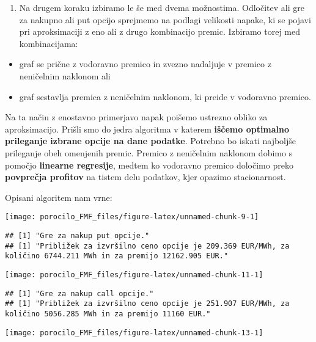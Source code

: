 \documentclass[
]{article}
\providecommand{\tightlist}{%
  \setlength{\itemsep}{0pt}\setlength{\parskip}{0pt}}
\begin{document}
\begin{enumerate}
\def\labelenumi{\arabic{enumi}.}
\setcounter{enumi}{1}
\tightlist
\item
  Na drugem koraku izbiramo le še med dvema možnostima. Odločitev ali
  gre za nakupno ali put opcijo sprejmemo na podlagi velikosti napake,
  ki se pojavi pri aproksimaciji z eno ali z drugo kombinacijo premic.
  Izbiramo torej med kombinacijama:
\end{enumerate}

\begin{itemize}
\tightlist
\item
  graf se prične z vodoravno premico in zvezno nadaljuje v premico z
  neničelnim naklonom ali
\item
  graf sestavlja premica z neničelnim naklonom, ki preide v vodoravno
  premico.
\end{itemize}

Na ta način z enostavno primerjavo napak poišemo ustrezno obliko za
aproksimacijo. Prišli smo do jedra algoritma v katerem \textbf{iščemo
optimalno prileganje izbrane opcije na dane podatke}. Potrebno bo iskati
najboljše prileganje obeh omenjenih premic. Premico z neničelnim
naklonom dobimo s pomočjo \textbf{linearne regresije}, medtem ko
vodoravno premico določimo preko \textbf{povprečja profitov} na tistem
delu podatkov, kjer opazimo stacionarnost.

Opisani algoritem nam vrne:

\begin{center}\texttt{[image: porocilo\_FMF\_files/figure-latex/unnamed-chunk-9-1]} \end{center}

\begin{verbatim}
## [1] "Gre za nakup put opcije."
## [1] "Približek za izvršilno ceno opcije je 209.369 EUR/MWh, za količino 6744.211 MWh in za premijo 12162.905 EUR."
\end{verbatim}

\begin{center}\texttt{[image: porocilo\_FMF\_files/figure-latex/unnamed-chunk-11-1]} \end{center}

\begin{verbatim}
## [1] "Gre za nakup call opcije."
## [1] "Približek za izvršilno ceno opcije je 251.907 EUR/MWh, za količino 5056.285 MWh in za premijo 11160 EUR."
\end{verbatim}

\begin{center}\texttt{[image: porocilo\_FMF\_files/figure-latex/unnamed-chunk-13-1]} \end{center}
\end{document}
